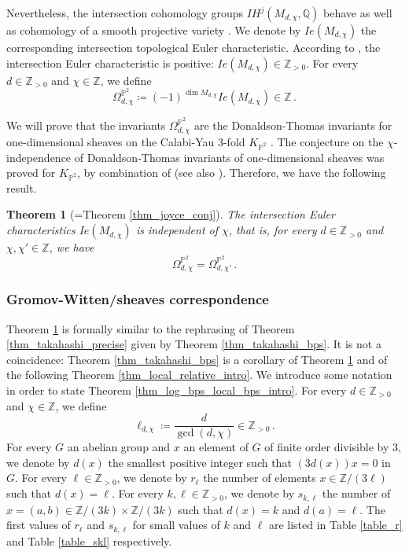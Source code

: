 \documentclass[11pt,letterpaper]{amsart}
\newtheorem{thm}[defn]{Theorem}
\newcommand\PP{\mathbb P}
\newcommand\Q{\mathbb Q}
\newcommand\Z{\mathbb Z}
\begin{document}
Nevertheless, the intersection cohomology groups $IH^j(M_{d,\chi}, \Q)$ behave as well as cohomology of a smooth projective variety
\cite{MR572580,MR696691,MR751966}.
We denote by $Ie(M_{d,\chi})$ the corresponding intersection topological Euler characteristic.
According to \cite[Corollary 6.1.3]{bousseau2019scattering}, the intersection Euler characteristic is positive:
$Ie(M_{d,\chi}) \in \Z_{>0}$.
For every $d \in \Z_{>0}$ and $\chi \in \Z$, we define 
\[ \Omega_{d,\chi}^{\PP^2}
\coloneq 
(-1)^{\dim M_{d,\chi}}
Ie(M_{d,\chi})\in \Z\,.\]

We will prove that the invariants $\Omega_{d,\chi}^{\PP^2}$ are the  Donaldson-Thomas invariants for
one-dimensional sheaves on the Calabi-Yau 3-fold $K_{\PP^2}$  \cite{MR2951762}. 
The conjecture
\cite[Conjecture 6.20]{MR2951762}
on the $\chi$-independence of Donaldson-Thomas invariants of one-dimensional sheaves was proved for $K_{\PP^2}$, 
by combination of \cite{MR2264664, MR2892766, MR2215440, MR2250076} (see also \cite[Appendix A]{MR3861701}). 
Therefore, we have the following result.

\begin{thm}[=Theorem \ref{thm_joyce_conj}] \label{thm_joyce_conj_intro}
The intersection Euler characteristics 
$Ie(M_{d,\chi})$ is independent of $\chi$, that is, for every $d \in \Z_{>0}$
and $\chi, \chi' \in \Z$, we have 
\[ \Omega_{d,\chi}^{\PP^2}=\Omega_{d,\chi'}^{\PP^2}\,.\]
\end{thm}


\subsubsection{Gromov-Witten/sheaves correspondence}
Theorem \ref{thm_joyce_conj_intro} is formally similar to the rephrasing of Theorem \ref{thm_takahashi_precise} given by 
Theorem \ref{thm_takahashi_bps}. It is not a coincidence: Theorem \ref{thm_takahashi_bps} is a corollary of Theorem 
\ref{thm_joyce_conj_intro} and of
the following Theorem \ref{thm_local_relative_intro}.
We introduce some notation in order to state Theorem \ref{thm_log_bps_local_bps_intro}.
For every $d \in \Z_{>0}$ and $\chi \in \Z$, we define
\[ \ell_{d,\chi} \coloneq \frac{d}{\gcd(d,\chi)} \in  \Z_{>0}\,.\]
For every $G$ an abelian group and $x$ an element of $G$ of finite order divisible by $3$, we denote by $d(x)$ the smallest positive integer such that 
$(3d(x))x=0$ in $G$.
For every $\ell \in \Z_{>0}$, we denote by $r_\ell$ the number of elements $x \in \Z/(3\ell)$ such that $d(x)=\ell$.
For every $k, \ell \in \Z_{>0}$, we denote by
$s_{k,\ell}$ the number of $x=(a,b)
\in \Z/(3k) \times \Z/(3k)$
such that 
$d(x)=k$ and $d(a)=\ell$. The first values of $r_{\ell}$ and $s_{k,\ell}$ for small values of $k$ and $\ell$ are 
listed in Table \ref{table_r} and Table \ref{table_skl} respectively.
\end{document}
